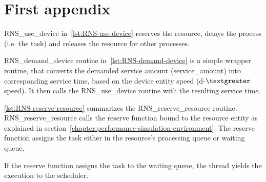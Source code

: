 \chapter{First appendix}
\label{chapter:first-appendix}


RNS\_use\_device in~\ref{lst:RNS-use-device} reserves the resource, delays the process (i.e. the task) and releases the resource for other processes.



RNS\_demand\_device routine in~\ref{lst:RNS-demand-device} is a simple wrapper routine, that converts the demanded service amount (service\_amount) into corresponding service time, based on the device entity speed (d-$\textgreater$speed). It then calls the RNS\_use\_device routine with the resulting service time.



\ref{lst:RNS-reserve-resource} summarizes the RNS\_reserve\_resource routine. RNS\_reserve\_resource calls the reserve function bound to the resource entity as explained in section~\ref{chapter:performance-simulation-environment}. The reserve function assigns the task either in the resource's processing queue or waiting queue.

If the reserve function assigns the task to the waiting queue, the thread yields the execution to the scheduler.




